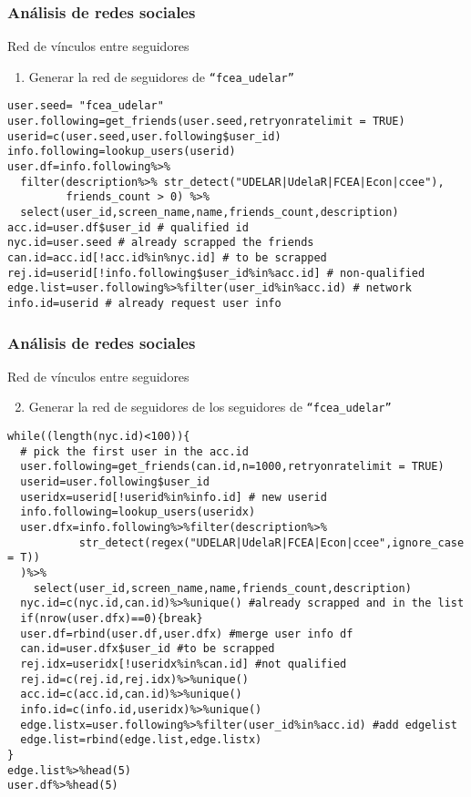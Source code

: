 \documentclass[11pt]{beamer}
\begin{document}
\begin{frame}[fragile]
 \frametitle{Análisis de redes sociales} 
Red de vínculos entre seguidores
\begin{enumerate}
    \item Generar la red de seguidores de \texttt{``fcea\_udelar''}
\end{enumerate}
\begin{verbatim} 
user.seed= "fcea_udelar"
user.following=get_friends(user.seed,retryonratelimit = TRUE)
userid=c(user.seed,user.following$user_id)
info.following=lookup_users(userid)
user.df=info.following%>%
  filter(description%>% str_detect("UDELAR|UdelaR|FCEA|Econ|ccee"),
         friends_count > 0) %>%
  select(user_id,screen_name,name,friends_count,description)
acc.id=user.df$user_id # qualified id
nyc.id=user.seed # already scrapped the friends
can.id=acc.id[!acc.id%in%nyc.id] # to be scrapped
rej.id=userid[!info.following$user_id%in%acc.id] # non-qualified
edge.list=user.following%>%filter(user_id%in%acc.id) # network
info.id=userid # already request user info
   \end{verbatim}
\end{frame}

\begin{frame}[fragile]
 \frametitle{Análisis de redes sociales} 
Red de vínculos entre seguidores
\begin{enumerate}  \setcounter{enumi}{1}
    \item Generar la red de seguidores de los seguidores de \texttt{``fcea\_udelar''}
\end{enumerate}
\begin{verbatim} 
while((length(nyc.id)<100)){
  # pick the first user in the acc.id
  user.following=get_friends(can.id,n=1000,retryonratelimit = TRUE)
  userid=user.following$user_id
  useridx=userid[!userid%in%info.id] # new userid
  info.following=lookup_users(useridx)
  user.dfx=info.following%>%filter(description%>%
           str_detect(regex("UDELAR|UdelaR|FCEA|Econ|ccee",ignore_case = T))
  )%>%
    select(user_id,screen_name,name,friends_count,description)
  nyc.id=c(nyc.id,can.id)%>%unique() #already scrapped and in the list
  if(nrow(user.dfx)==0){break}
  user.df=rbind(user.df,user.dfx) #merge user info df
  can.id=user.dfx$user_id #to be scrapped
  rej.idx=useridx[!useridx%in%can.id] #not qualified
  rej.id=c(rej.id,rej.idx)%>%unique()
  acc.id=c(acc.id,can.id)%>%unique()
  info.id=c(info.id,useridx)%>%unique()
  edge.listx=user.following%>%filter(user_id%in%acc.id) #add edgelist
  edge.list=rbind(edge.list,edge.listx)
}
edge.list%>%head(5)
user.df%>%head(5)
    \end{verbatim}
\end{frame}
\end{document}
